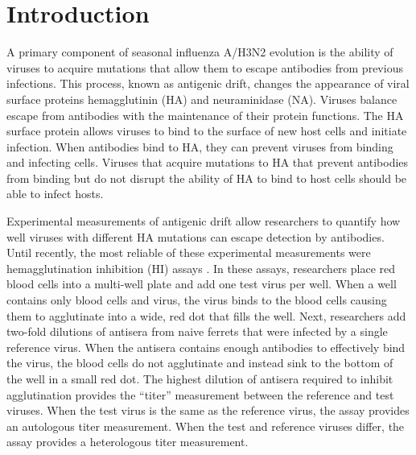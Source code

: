 \documentclass[utf8]{FrontiersinHarvard} %
\begin{document}
\section{Introduction}

A primary component of seasonal influenza A/H3N2 evolution is the ability of viruses to acquire mutations that allow them to escape antibodies from previous infections.
This process, known as antigenic drift, changes the appearance of viral surface proteins hemagglutinin (HA) and neuraminidase (NA).
Viruses balance escape from antibodies with the maintenance of their protein functions.
The HA surface protein allows viruses to bind to the surface of new host cells and initiate infection.
When antibodies bind to HA, they can prevent viruses from binding and infecting cells.
Viruses that acquire mutations to HA that prevent antibodies from binding but do not disrupt the ability of HA to bind to host cells should be able to infect hosts.

Experimental measurements of antigenic drift allow researchers to quantify how well viruses with different HA mutations can escape detection by antibodies.
Until recently, the most reliable of these experimental measurements were hemagglutination inhibition (HI) assays \citep{hirst1943studies}.
In these assays, researchers place red blood cells into a multi-well plate and add one test virus per well.
When a well contains only blood cells and virus, the virus binds to the blood cells causing them to agglutinate into a wide, red dot that fills the well.
Next, researchers add two-fold dilutions of antisera from naive ferrets that were infected by a single reference virus.
When the antisera contains enough antibodies to effectively bind the virus, the blood cells do not agglutinate and instead sink to the bottom of the well in a small red dot.
The highest dilution of antisera required to inhibit agglutination provides the ``titer'' measurement between the reference and test viruses.
When the test virus is the same as the reference virus, the assay provides an autologous titer measurement.
When the test and reference viruses differ, the assay provides a heterologous titer measurement.
\end{document}
